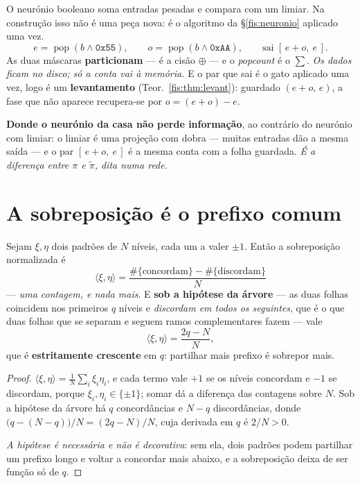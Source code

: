 \documentclass[livro.tex]{subfiles}
\begin{document}
\noindent O neurónio booleano soma entradas pesadas e compara com um limiar. Na
construção isso não é uma peça nova: é o algoritmo da §\ref{fis:neuronio}
aplicado uma vez.
\[
e=\operatorname{pop}(b\wedge\mathtt{0x55}),\qquad
o=\operatorname{pop}(b\wedge\mathtt{0xAA}),\qquad
\text{sai } [\,e+o,\ e\,] .
\]
As duas máscaras \textbf{particionam} --- é a cisão $\oplus$ --- e o
\emph{popcount} é o $\sum$. \emph{Os dados ficam no disco; só a conta vai à
memória.} E o par que sai é o gato aplicado uma vez, logo é um
\textbf{levantamento} (Teor.~\ref{fis:thm:levant}): guardado $(e+o,\,e)$, a fase
que não aparece recupera-se por $o=(e+o)-e$.

\medskip\noindent\textbf{Donde o neurónio da casa não perde informação}, ao
contrário do neurónio com limiar: o limiar é uma projeção com dobra --- muitas
entradas dão a mesma saída --- e o par $[\,e+o,\ e\,]$ é a mesma conta com a
folha guardada. \emph{É a diferença entre $\pi$ e $\tilde\pi$, dita numa rede.}

\section{A sobreposição é o prefixo comum}\label{fis:sobrepoe}

\begin{teorema}\label{fis:thm:sobrepoe}
Sejam $\xi,\eta$ dois padrões de $N$ níveis, cada um a valer $\pm1$. Então a
sobreposição normalizada é
\[
\boxed{\;\langle\xi,\eta\rangle=\frac{\#\{\text{concordam}\}-\#\{\text{discordam}\}}{N}\;}
\]
--- \emph{uma contagem, e nada mais}. E \textbf{sob a hipótese da árvore} --- as
duas folhas coincidem nos primeiros $q$ níveis e \emph{discordam em todos os
seguintes}, que é o que duas folhas que se separam e seguem ramos complementares
fazem --- vale
\[
\langle\xi,\eta\rangle=\frac{2q-N}{N} ,
\]
que é \textbf{estritamente crescente} em $q$: partilhar mais prefixo é sobrepor
mais.
\end{teorema}

\begin{proof}
$\langle\xi,\eta\rangle=\tfrac1N\sum_i\xi_i\eta_i$, e cada termo vale $+1$ se os
níveis concordam e $-1$ se discordam, porque $\xi_i,\eta_i\in\{\pm1\}$; somar dá
a diferença das contagens sobre $N$. Sob a hipótese da árvore há $q$ concordâncias
e $N-q$ discordâncias, donde $\bigl(q-(N-q)\bigr)/N=(2q-N)/N$, cuja derivada em
$q$ é $2/N>0$.

\emph{A hipótese é necessária e não é decorativa}: sem ela, dois padrões podem
partilhar um prefixo longo e voltar a concordar mais abaixo, e a sobreposição
deixa de ser função só de $q$.
\end{proof}
\end{document}
